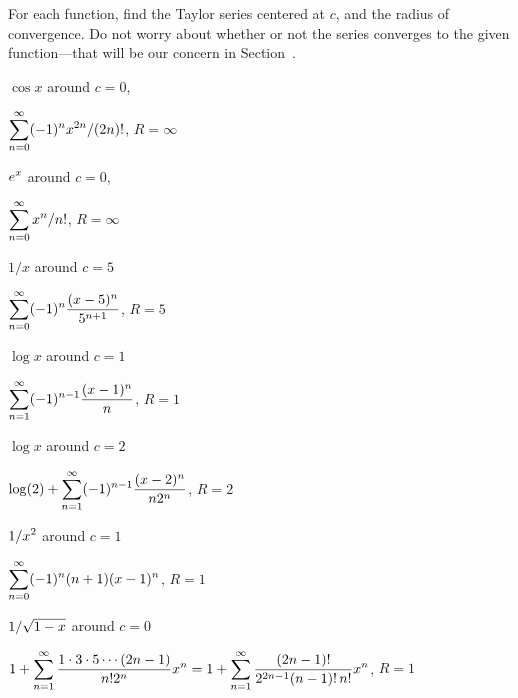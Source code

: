 \begin{exercises}

  For each function, find the Taylor series centered at $c$, and the
  radius of convergence.  Do not worry about whether or not the series
  converges to the given function---that will be our concern in 
  Section~.

\begin{exercise} $\cos x$ around $c = 0$,
\begin{answer} $\displaystyle\sum_{n=0}^\infty (-1)^n x^{2n}/(2n)!$, $R=\infty$
\end{answer}\end{exercise}

\begin{exercise} $\displaystyle e^x$ around $c = 0$,
\begin{answer} $\displaystyle\sum_{n=0}^\infty x^n/n!$, $R=\infty$
\end{answer}\end{exercise}

\begin{exercise} $1/x$ around $c=5$
\begin{answer} $\displaystyle\sum_{n=0}^\infty (-1)^n{(x-5)^n\over 5^{n+1}}$, $R=5$
\end{answer}\end{exercise}

\begin{exercise} $\log x$ around $c=1$
\begin{answer} $\displaystyle\sum_{n=1}^\infty (-1)^{n-1}{(x-1)^n\over n}$, $R=1$
\end{answer}\end{exercise}

\begin{exercise} $\log x$ around $c=2$
\begin{answer} $\displaystyle\log(2)+\sum_{n=1}^\infty (-1)^{n-1}{(x-2)^n\over n 2^n}$, $R=2$
\end{answer}\end{exercise}

\begin{exercise} $\displaystyle 1/x^2$ around $c=1$
\begin{answer} $\displaystyle\sum_{n=0}^\infty (-1)^n(n+1)(x-1)^n$, $R=1$
\end{answer}\end{exercise}

\begin{exercise} $\displaystyle 1/\sqrt{1-x}$ around $c = 0$
\begin{answer} $\displaystyle1+\sum_{n=1}^\infty {1\cdot3\cdot5\cdots(2n-1)\over
n!2^n} x^n=1+\sum_{n=1}^\infty {(2n-1)!\over 2^{2n-1}(n-1)!\,n!}x^n$, $R=1$
\end{answer}\end{exercise}


\end{exercises}
